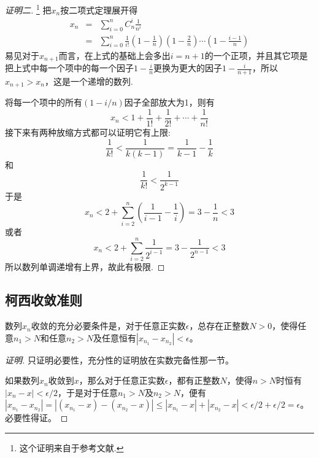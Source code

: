 \begin{proof}[证明二]\footnote{这个证明来自于参考文献\cite{math-analysis}.}
  把$x_n$按二项式定理展开得
  \begin{eqnarray*}
    x_n & = & \sum_{i=0}^n C_n^i \frac{1}{n^i} \\
    & = & \sum_{i=0}^n \frac{1}{i!}\left( 1-\frac{1}{n} \right) \left( 1-\frac{2}{n} \right)\cdots \left( 1-\frac{i-1}{n} \right)
  \end{eqnarray*}
  易见对于$x_{n+1}$而言，在上式的基础上会多出$i=n+1$的一个正项，并且其它项是把上式中每一个项中的每一个因子$1-\frac{i}{n}$更换为更大的因子$1-\frac{i}{n+1}$，所以$x_{n+1}>x_n$，这是一个递增的数列.

  将每一个项中的所有$(1-i/n)$因子全部放大为1，则有
  \[  x_n < 1+\frac{1}{1!}+\frac{1}{2!}+\cdots+\frac{1}{n!} \]
  接下来有两种放缩方式都可以证明它有上限:
  \[ \frac{1}{k!} < \frac{1}{k(k-1)} = \frac{1}{k-1} - \frac{1}{k} \]
  和
  \[ \frac{1}{k!} < \frac{1}{2^{k-1}} \]
  于是
  \[ x_n < 2 + \sum_{i=2}^n \left( \frac{1}{i-1}-\frac{1}{i} \right) = 3-\frac{1}{n} < 3 \]
  或者
  \[ x_n < 2 + \sum_{i=2}^n \frac{1}{2^{i-1}} = 3-\frac{1}{2^{n-1}} < 3 \]
  所以数列单调递增有上界，故此有极限.
\end{proof}


\subsection{柯西收敛准则}
\label{sec:cauchy-converage-principle}

\begin{theorem}[柯西收敛准则]
  数列$x_n$收敛的充分必要条件是，对于任意正实数$\epsilon$，总存在正整数$N>0$，使得任意$n_1>N$和任意$n_2>N$及任意恒有$|x_{n_1}-x_{n_2}| < \epsilon$。
\end{theorem}

\begin{proof}[证明]
  只证明必要性，充分性的证明放在实数完备性那一节。

  如果数列$x_n$收敛到$x$，那么对于任意正实数$\epsilon$，都有正整数$N$，使得$n>N$时恒有$|x_n-x|<\epsilon / 2$，于是对于任意$n_1>N$及$n_2>N$，便有$|x_{n_1}-x_{n_2}|=|(x_{n_1}-x)- (x_{n_2}-x)|\leqslant |x_{n_1}-x|+|x_{n_2}-x|<\epsilon / 2+\epsilon / 2 = \epsilon$。必要性得证。
\end{proof}

